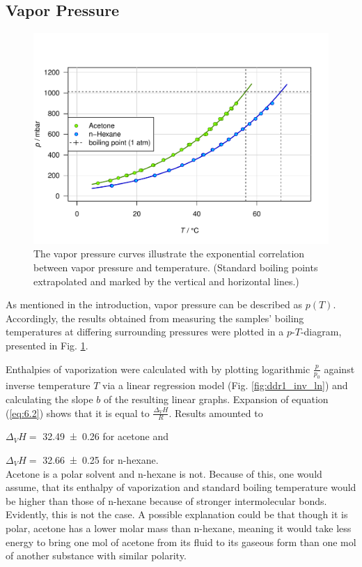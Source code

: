 \subsection{Vapor Pressure}

\begin{figure}[H]
    \centering
    \includegraphics[width=.5\textwidth]{figures/DDR1_t_p.pdf}
    \caption{The vapor pressure curves illustrate the exponential correlation between vapor pressure and temperature. (Standard boiling points extrapolated and marked by the vertical and horizontal lines.)}
    \label{fig:ddr1_t_p}
\end{figure}

As mentioned in the introduction, vapor pressure can be described as $p(T)$. Accordingly, the results obtained from measuring the samples' boiling temperatures at differing surrounding pressures were plotted in a $p$-$T$-diagram, presented in Fig. \ref{fig:ddr1_t_p}.

Enthalpies of vaporization were calculated with by plotting logarithmic $\frac{p}{p_0}$ against inverse temperature $T$ via a linear regression model (Fig. \ref{fig:ddr1_inv_ln}) and calculating the slope $b$ of the resulting linear graphs. Expansion of equation (\ref{eq:6.2}) shows that it is equal to $\frac{\Delta_VH}{R}$. Results amounted to 

$\Delta_VH=$ \qty{32.49 \pm 0.26}{\kJpmole} for acetone and 

$\Delta_VH=$ \qty{32.66 \pm 0.25}{\kJpmole} for n-hexane. 
\\Acetone is a polar solvent and n-hexane is not. Because of this, one would assume, that its enthalpy of vaporization and standard boiling temperature would be higher than those of n-hexane because of stronger intermolecular bonds. Evidently, this is not the case. A possible explanation could be that though it is polar, acetone has a lower molar mass than n-hexane, meaning it would take less  energy to bring one mol of acetone from its fluid to its gaseous form than one mol of another substance with similar polarity.

